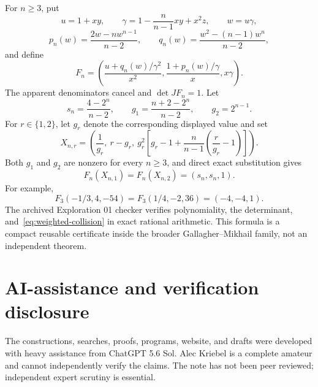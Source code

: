 \documentclass[11pt]{article}
\begin{document}
For $n\ge3$, put
\[
u=1+xy,\qquad
\gamma=1-\frac{n}{n-1}xy+x^2z,\qquad w=u\gamma,
\]
\[
p_n(w)=\frac{2w-nw^{n-1}}{n-2},\qquad
q_n(w)=\frac{w^2-(n-1)w^n}{n-2},
\]
and define
\begin{equation}
F_n=\left(
\frac{u+q_n(w)/\gamma^2}{x^2},
\frac{1+p_n(w)/\gamma}{x},
x\gamma
\right).
\label{eq:weighted-specialization}
\end{equation}
The apparent denominators cancel and $\det JF_n=1$. Let
\[
s_n=\frac{4-2^n}{n-2},\qquad
g_1=\frac{n+2-2^n}{n-2},\qquad g_2=2^{n-1}.
\]
For $r\in\{1,2\}$, let $g_r$ denote the corresponding displayed value and set
\begin{equation}
X_{n,r}=\left(
\frac1{g_r},\ r-g_r,\
g_r^2\left[g_r-1+\frac n{n-1}
\left(\frac r{g_r}-1\right)\right]
\right).
\label{eq:weighted-points}
\end{equation}
Both $g_1$ and $g_2$ are nonzero for every $n\ge3$, and direct exact
substitution gives
\begin{equation}
F_n(X_{n,1})=F_n(X_{n,2})=(s_n,s_n,1).
\label{eq:weighted-collision}
\end{equation}
For example,
\[
F_3(-1/3,4,-54)=F_3(1/4,-2,36)=(-4,-4,1).
\]
The archived Exploration 01 checker verifies polynomiality, the determinant,
and~\eqref{eq:weighted-collision} in exact rational arithmetic. This formula
is a compact reusable certificate inside the broader Gallagher--Mikhail
family, not an independent theorem.

\section*{AI-assistance and verification disclosure}
The constructions, searches, proofs, programs, website, and drafts were
developed with heavy assistance from ChatGPT 5.6 Sol. Alec Kriebel is a
complete amateur and cannot independently verify the claims. The note has not
been peer reviewed; independent expert scrutiny is essential.
\end{document}
